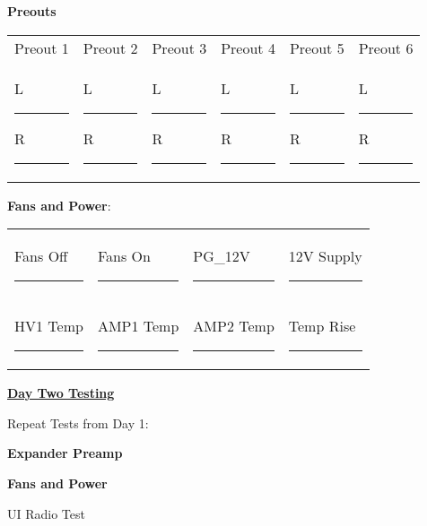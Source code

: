 \documentclass{article}
\begin{document}
\begin{checklist}
  \item \textbf{Preouts}
\end{checklist}
{\renewcommand{\arraystretch}{1.5} %
\hspace{2em}\begin{tabularx}{48em}{XXXXXX}
  Preout 1 & Preout 2 & Preout 3 & Preout 4 & Preout 5 & Preout 6 \\
  L \rule{2em}{0.4pt} R \rule{2em}{0.4pt} &
  L \rule{2em}{0.4pt} R \rule{2em}{0.4pt} &
  L \rule{2em}{0.4pt} R \rule{2em}{0.4pt} &
  L \rule{2em}{0.4pt} R \rule{2em}{0.4pt} &
  L \rule{2em}{0.4pt} R \rule{2em}{0.4pt} &
  L \rule{2em}{0.4pt} R \rule{2em}{0.4pt} \\
\end{tabularx}}

\begin{checklist}
  \item \textbf{Fans and Power}:
\end{checklist}
{\renewcommand{\arraystretch}{1.5} %
\hspace{2em}\begin{tabularx}{40em}{XXXX}
  Fans Off  \hfill\rule{3em}{0.4pt} & Fans On   \hfill\rule{3em}{0.4pt} & PG\_12V   \hfill\rule{3em}{0.4pt} & 12V Supply \hfill\rule{3em}{0.4pt} \\
  HV1 Temp  \hfill\rule{3em}{0.4pt} & AMP1 Temp \hfill\rule{3em}{0.4pt} & AMP2 Temp \hfill\rule{3em}{0.4pt} & Temp Rise  \hfill\rule{3em}{0.4pt} \\
\end{tabularx}}

\bigskip
\textbf{\underline{Day Two Testing}}
\begin{checklist}
\item Repeat Tests from Day 1:
\begin{checklist}
  \item \textbf{Expander Preamp}
  \item \textbf{Fans and Power}
\end{checklist}
\item UI Radio Test
\end{checklist}
\end{document}

